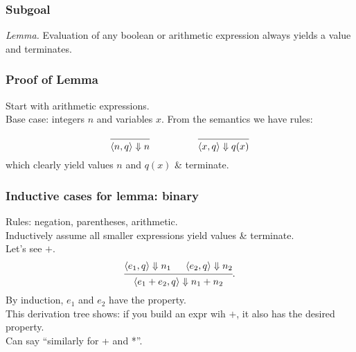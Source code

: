 \documentclass{beamer}
\newenvironment{changemargin}[1]{%
  \begin{list}{}{%
    \setlength{\topsep}{0pt}%
    \setlength{\leftmargin}{#1}%
    \setlength{\rightmargin}{1em}
    \setlength{\listparindent}{\parindent}%
    \setlength{\itemindent}{\parindent}%
    \setlength{\parsep}{\parskip}%
  }%
  \item[]}{\end{list}}
\begin{document}
\begin{frame}
  \frametitle{Subgoal}
  \Large
  \begin{changemargin}{2em}
\emph{Lemma.}
  Evaluation of any boolean or arithmetic expression always yields a value and terminates.
  \end{changemargin}
\end{frame}


\begin{frame}
  \frametitle{Proof of Lemma}
  \Large
  \begin{changemargin}{2em}
    Start with arithmetic expressions.\\[1em]

    Base case: integers $n$ and variables $x$. From the semantics we have rules:
    
\[
\begin{array}{ccc}
  \begin{prooftree}
  \infer0{\langle n, q \rangle \Downarrow n},
\end{prooftree} & \hspace*{3em} & 
\begin{prooftree}
  \infer0{\langle x, q \rangle \Downarrow q(x)}
\end{prooftree}
\end{array}
\]
which clearly yield values $n$ and $q(x)$ \& terminate.

  \end{changemargin}
\end{frame}

\begin{frame}
  \frametitle{Inductive cases for lemma: binary}
  \begin{changemargin}{2em}
    Rules: negation, parentheses, arithmetic.\\[1em]

    Inductively assume all smaller expressions yield values \& terminate.\\[1em]

    Let's see $+$.
\[
  \begin{prooftree}
    \hypo{\langle e_1, q \rangle \Downarrow n_1}
    \hypo{\langle e_2, q \rangle \Downarrow n_2}
  \infer2{\langle e_1 + e_2, q \rangle \Downarrow n_1 + n_2}
  \end{prooftree}
  .
  \]
  By induction, $e_1$ and $e_2$ have the property.\\[1em]
  This derivation tree shows: if you build an expr wih $+$, it also has
  the desired property.\\[1em]

  Can say ``similarly for + and *''.
  \end{changemargin}
\end{frame}
\end{document}
